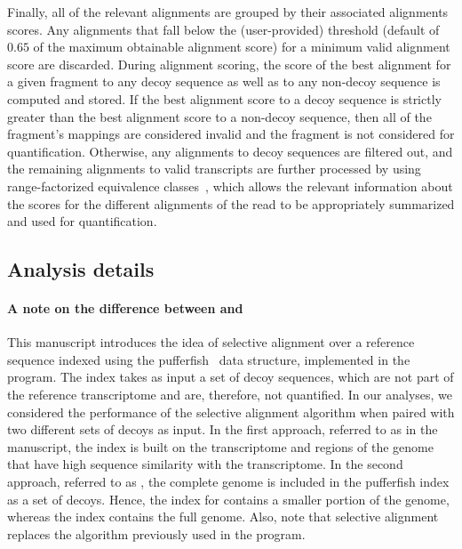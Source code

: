 Finally, all of the relevant alignments are grouped by their associated
alignments scores. Any alignments that fall below the (user-provided) threshold
(default of $0.65$ of the maximum obtainable alignment score) for a minimum
valid alignment score are discarded. During alignment scoring, the score of the
best alignment for a given fragment to any decoy sequence as well as to any
non-decoy sequence is computed and stored. If the best alignment score to a
decoy sequence is strictly greater than the best alignment score to a non-decoy
sequence, then all of the fragment's mappings are considered invalid and the
fragment is not considered for quantification. Otherwise, any alignments to
decoy sequences are filtered out, and the remaining alignments to valid
transcripts are further processed by \salmon using range-factorized equivalence
classes~\citep{ddfact}, which allows the relevant information about the scores
for the different alignments of the read to be appropriately summarized and used
for quantification.

\subsection{Analysis details}
\label{subsec:notes}

\paragraph{A note on the difference between \hsa and \saf}
This manuscript introduces the idea of selective alignment over a reference sequence 
indexed using the pufferfish~\citep{pufferfish} data structure, implemented in the \salmon program. The index
takes as input a set of decoy sequences, which are not part of the reference transcriptome 
and are, therefore, not quantified. In our analyses, we considered the performance of the selective alignment 
algorithm when paired with two different sets of decoys as input. In the first approach, referred to as \hsa in the manuscript, 
the index is built on the transcriptome and regions of the genome that
have high sequence similarity with the transcriptome. In the second approach, referred to as \saf, 
the complete genome is included in the pufferfish index as a set of decoys. Hence, the 
index for \hsa contains a smaller portion of the genome, whereas the \saf index contains
the full genome. Also, note that selective alignment replaces the \qm algorithm previously 
used in the \salmon program.

